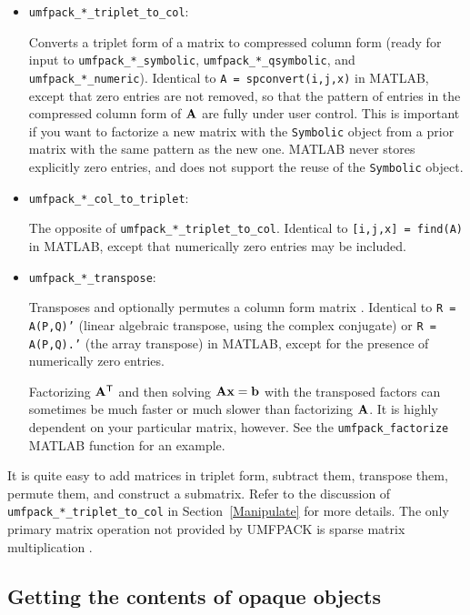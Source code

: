 \begin{itemize}
\item {\tt umfpack\_*\_triplet\_to\_col}:

    Converts a triplet form of a matrix to compressed column form (ready for
    input to {\tt umfpack\_*\_symbolic}, {\tt umfpack\_*\_qsymbolic}, and
    {\tt umfpack\_*\_numeric}).  Identical to {\tt A = spconvert(i,j,x)} in
    MATLAB, except that zero entries are not removed, so that the pattern of
    entries in the compressed column form of ${\bf{A}}$ are fully under user
    control.  This is important if you want to factorize a new matrix with the
    {\tt Symbolic} object from a prior matrix with the same pattern as the new
    one.  MATLAB never stores explicitly zero entries, and does not support
    the reuse of the {\tt Symbolic} object.

\item {\tt umfpack\_*\_col\_to\_triplet}:

    The opposite of {\tt umfpack\_*\_triplet\_to\_col}.  Identical to
    {\tt [i,j,x] = find(A)} in MATLAB, except that numerically zero entries
    may be included.

\item {\tt umfpack\_*\_transpose}:

    Transposes and optionally permutes a column form matrix \cite{Gustavson78}.
    Identical to
    {\tt R = A(P,Q)'} (linear algebraic transpose, using the complex conjugate)
    or {\tt R = A(P,Q).'} (the array transpose)
    in MATLAB, except for the presence of numerically zero entries.

    Factorizing ${\bf{A}}^{\sf T}$ and then solving ${\bf{Ax}}={\bf{b}}$ with the transposed
    factors can sometimes be much faster or much slower than factorizing
    ${\bf{A}}$.  It is highly dependent on your particular matrix, however.
    See the {\tt umfpack\_factorize} MATLAB function for an example.

\end{itemize}

It is quite easy to add matrices in triplet form, subtract them, transpose
them, permute them, and construct a submatrix.  Refer to the discussion of
{\tt umfpack\_*\_triplet\_to\_col} in Section~\ref{Manipulate} for more details.
The only primary matrix operation not provided by UMFPACK is sparse matrix
multiplication \cite{Gustavson78}.

\subsection{Getting the contents of opaque objects}

